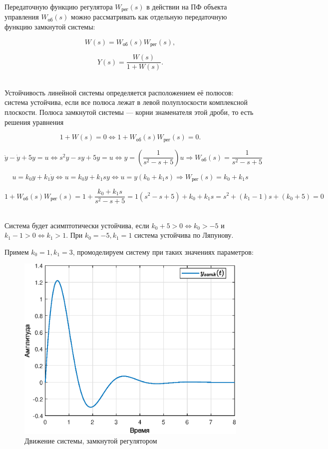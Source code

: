 \documentclass[a4paper]{article}
\begin{document}
Передаточную функцию регулятора $W_{\text{рег}}(s)$ в действии на ПФ объекта управления $W_{\text{об}}(s)$ можно рассматривать как отдельную передаточную функцию замкнутой системы:

$$
W(s) = W_{\text{об}}(s)W_{\text{рег}}(s),
$$

$$
Y(s) = \frac{W(s)}{1+W(s)}.
$$\

Устойчивость линейной системы определяется расположением её полюсов: система устойчива, если все полюса лежат в левой полуплоскости комплексной плоскости. Полюса замкнутой системы --- корни знаменателя этой дроби, то есть решения уравнения

$$
1 + W(s) = 0 \Leftrightarrow 1 + W_{\text{об}}(s)W_{\text{рег}}(s) = 0.
$$

$$
\ddot{y} - \dot{y} + 5y = u \Leftrightarrow s^2y-sy+5y = u \Leftrightarrow y = \left(\frac{1}{s^2-s+5}\right)u \Rightarrow W_{\text{об}}(s) = \frac{1}{s^2-s+5}
$$

$$
u = k_0 y+k_1\dot{y} \Leftrightarrow u = k_0y + k_1sy \Leftrightarrow u = y(k_0 + k_1s) \Rightarrow W_{\text{рег}}(s) = k_0 + k_1s
$$

$$
1 + W_{\text{об}}(s)W_{\text{рег}}(s) = 1 + \frac{k_0 + k_1s}{s^2-s+5} = 1(s^2-s+5) + k_0+k_1s = s^2 + (k_1-1)s+(k_0+5)=0
$$\ 

Система будет асимптотически устойчива, если $k_0+5 > 0 \Leftrightarrow k_0 > -5$ и $k_1-1 > 0 \Leftrightarrow k_1 > 1$. При $k_0 = -5, k_1 = 1$ система устойчива по Ляпунову.\ 

Примем $k_0 = 1, k_1 = 3$, промоделируем систему при таких значениях параметров:

\begin{figure}[H]
    \centering
    \includegraphics[width=0.65\linewidth]{ex1/zamk_fig.eps}
    \caption{Движение системы, замкнутой регулятором}
\end{figure}\
\end{document}
